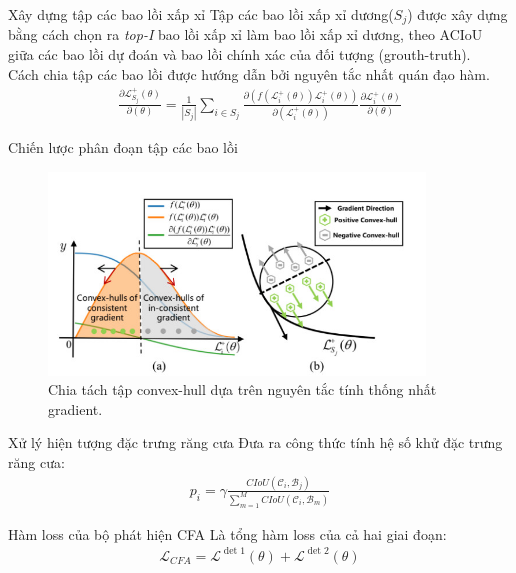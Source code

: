 \documentclass[11pt]{beamer}
\theoremstyle{definition}
\theoremstyle{plain}
\theoremstyle{plain}
\theoremstyle{remark}
\begin{document}
	\begin{frame}{Xây dựng tập các bao lồi xấp xỉ}
		Tập các bao lồi xấp xỉ dương($S_j$) được xây dựng bằng cách chọn ra \textit{top-I} bao lồi xấp xỉ làm bao lồi xấp xỉ dương, theo ACIoU giữa các bao lồi dự đoán và bao lồi chính xác của đối tượng (grouth-truth).\\
			Cách chia tập các bao lồi được hướng dẫn bởi nguyên tắc nhất quán đạo hàm.
		\begin{align} \label{ptdd7}
			\frac{\partial\mathcal{L}_{S_j}^+ (\theta)}{\partial (\theta)} = \frac{1}{|S_j|} \sum_{i \in {S_j}} \frac{\partial (f(\mathcal{L}_i^+(\theta))\mathcal{L}_i^{+}(\theta))}{\partial (\mathcal{L}_i^+(\theta))} \frac{\partial \mathcal{L}_i^+ (\theta)}{\partial (\theta)}
		\end{align}
	\end{frame}
	\begin{frame}{Chiến lược phân đoạn tập các bao lồi}
		\begin{figure}[ht!]
			\begin{center}
				\includegraphics[width=10cm]{./Hinh_9.jpg}
				\caption{Chia tách tập convex-hull dựa trên nguyên tắc tính thống nhất gradient.}
				\label{upper_convex_function}
			\end{center}
		\end{figure}
	\end{frame}
	\begin{frame}{Xử lý hiện tượng đặc trưng răng cưa}
		Đưa ra công thức tính hệ số khử đặc trưng răng cưa:
		\begin{align} \label{ptdd8}
			p_i = \gamma \frac{CIoU (\mathcal{C}_i, \mathcal{B}_j)}{\sum_{m=1}^{M} CIoU (\mathcal{C}_i, \mathcal{B}_m)}
		\end{align}
	
		
		
	\end{frame}
	\begin{frame}{Hàm loss của bộ phát hiện CFA}
		Là tổng hàm loss của cả hai giai đoạn:
		\begin{align}
			\mathcal{L}_{CFA} = \mathcal{L}^{\operatorname{det} 1}(\theta)+\mathcal{L}^{\operatorname{det} 2}(\theta)
		\end{align}
		
	\end{frame}
\end{document}
